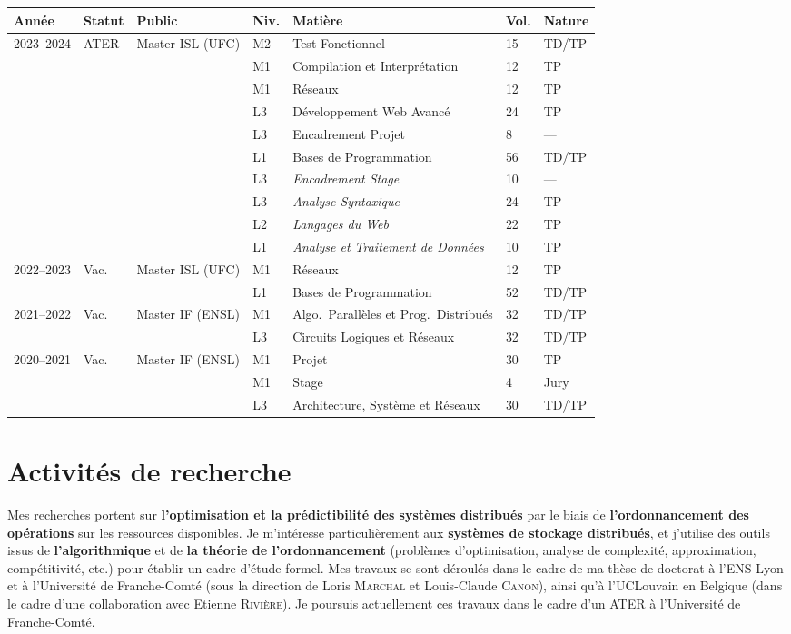 \documentclass[12pt]{article}
\begin{document}
\begin{center}
    \footnotesize
    \begin{tabularx}{\linewidth}{p{2cm}lp{3cm}lXll}
        \toprule
        Année & Statut & Public & Niv. & Matière & Vol. & Nature \tabularnewline
        \midrule
        2023--2024 & ATER & Master ISL (UFC) & M2 & Test Fonctionnel & 15 & TD/TP \tabularnewline
        & & & M1 & Compilation et Interprétation & 12 & TP \tabularnewline
        & & & M1 & Réseaux & 12 & TP \tabularnewline
        & & & L3 & Développement Web Avancé & 24 & TP \tabularnewline
        & & & L3 & Encadrement Projet & 8 & --- \tabularnewline
        & & & L1 & Bases de Programmation & 56 & TD/TP \tabularnewline
        \cmidrule{4-7}
        & & & L3 & \emph{Encadrement Stage} & 10 & --- \tabularnewline
        & & & L3 & \emph{Analyse Syntaxique} & 24 & TP \tabularnewline
        & & & L2 & \emph{Langages du Web} & 22 & TP \tabularnewline
        & & & L1 & \emph{Analyse et Traitement de Données} & 10 & TP \tabularnewline
        \midrule
        2022--2023 & Vac. & Master ISL (UFC) & M1 & Réseaux & 12 & TP \tabularnewline
        & & & L1 & Bases de Programmation & 52 & TD/TP \tabularnewline
        \midrule
        2021--2022 & Vac. & Master IF (ENSL) & M1 & Algo.\ Parallèles et Prog.\ Distribués & 32 & TD/TP \tabularnewline
        & & & L3 & Circuits Logiques et Réseaux & 32 & TD/TP \tabularnewline
        \midrule
        2020--2021 & Vac. & Master IF (ENSL) & M1 & Projet & 30 & TP \tabularnewline
        & & & M1 & Stage & 4 & Jury \tabularnewline
        & & & L3 & Architecture, Système et Réseaux & 30 & TD/TP \tabularnewline
        \bottomrule
    \end{tabularx}
\end{center}

\section{Activités de recherche}

Mes recherches portent sur \textbf{l'optimisation et la prédictibilité des systèmes distribués} par
le biais de \textbf{l'ordonnancement des opérations} sur les ressources disponibles.  
Je m'intéresse particulièrement aux \textbf{systèmes de stockage distribués}, et j'utilise des
outils issus de \textbf{l'algorithmique} et de \textbf{la théorie de l'ordonnancement} (problèmes
d'optimisation, analyse de complexité, approximation, compétitivité, etc.) pour établir un cadre
d'étude formel.  
Mes travaux se sont déroulés dans le cadre de ma thèse de doctorat à l'ENS Lyon et à l'Université de
Franche-Comté (sous la direction de Loris \textsc{Marchal} et Louis-Claude \textsc{Canon}), ainsi
qu'à l'UCLouvain en Belgique (dans le cadre d'une collaboration avec Etienne \textsc{Rivière}).  
Je poursuis actuellement ces travaux dans le cadre d'un ATER à l'Université de Franche-Comté.
\end{document}
